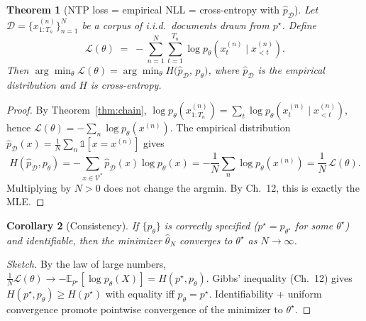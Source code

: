 \documentclass[11pt]{article}
\newtheorem{theorem}{Theorem}[section]
\newtheorem{corollary}[theorem]{Corollary}
\theoremstyle{remark}
\begin{document}
\begin{theorem}[NTP loss = empirical NLL = cross-entropy with $\hat p_{\mathcal{D}}$]\label{thm:ntp}
Let $\mathcal{D} = \{x^{(n)}_{1:T_n}\}_{n=1}^{N}$ be a corpus of i.i.d.\ documents drawn from $p^\star$. Define
\[
  \mathcal{L}(\theta) \;=\; -\sum_{n=1}^{N}\sum_{t=1}^{T_n} \log p_\theta\!\left(x^{(n)}_t \mid x^{(n)}_{<t}\right).
\]
Then $\arg\min_\theta \mathcal{L}(\theta) = \arg\min_\theta H\!\big(\hat p_{\mathcal{D}},\, p_\theta\big)$, where $\hat p_{\mathcal{D}}$ is the empirical distribution and $H$ is cross-entropy.
\end{theorem}
\begin{proof}
By Theorem~\ref{thm:chain}, $\log p_\theta(x_{1:T_n}^{(n)}) = \sum_t \log p_\theta(x_t^{(n)}\mid x_{<t}^{(n)})$, hence $\mathcal{L}(\theta) = -\sum_n \log p_\theta(x^{(n)})$. The empirical distribution $\hat p_{\mathcal{D}}(x) = \frac{1}{N}\sum_n \mathbb{1}[x = x^{(n)}]$ gives
\[
  H(\hat p_{\mathcal{D}}, p_\theta) = -\!\!\sum_{x\in\mathcal{V}^*}\hat p_{\mathcal{D}}(x)\log p_\theta(x) = -\frac{1}{N}\sum_n \log p_\theta(x^{(n)}) = \frac{1}{N}\,\mathcal{L}(\theta).
\]
Multiplying by $N>0$ does not change the argmin. By Ch.~12, this is exactly the MLE.
\end{proof}

\begin{corollary}[Consistency]
If $\{p_\theta\}$ is correctly specified ($p^\star = p_{\theta^\star}$ for some $\theta^\star$) and identifiable, then the minimizer $\hat\theta_N$ converges to $\theta^\star$ as $N\to\infty$.
\end{corollary}
\begin{proof}[Sketch]
By the law of large numbers, $\frac{1}{N}\mathcal{L}(\theta) \to -\mathbb{E}_{p^\star}\!\left[\log p_\theta(X)\right] = H(p^\star, p_\theta)$. Gibbs' inequality (Ch.~12) gives $H(p^\star, p_\theta)\ge H(p^\star)$ with equality iff $p_\theta = p^\star$. Identifiability + uniform convergence promote pointwise convergence of the minimizer to $\theta^\star$.
\end{proof}
\end{document}
